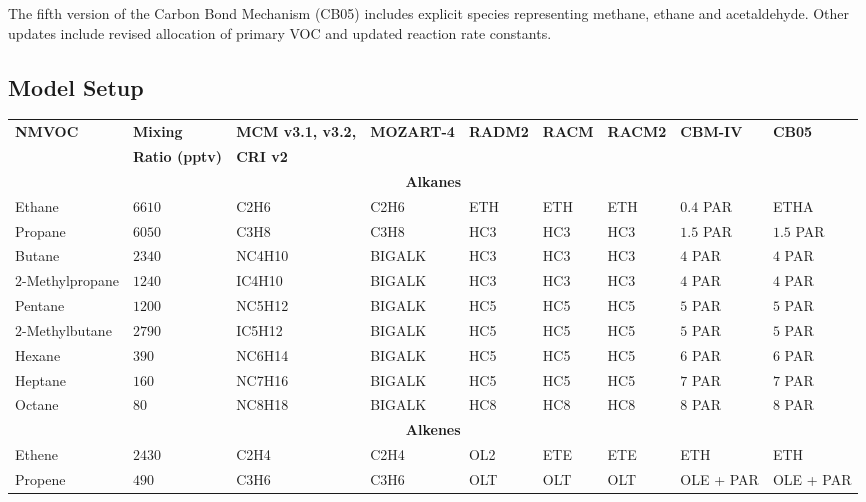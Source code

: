 The fifth version of the Carbon Bond Mechanism (CB05) \citep{Yarwood:2005} includes explicit species representing methane, ethane and acetaldehyde. 
Other updates include revised allocation of primary VOC and updated reaction rate constants.

\subsection{Model Setup} \label{ss:model_setup}

\begin{sidewaystable}
    \centering
    \begin{tabular}{lllllllll}
        \hline \hline
        \multirow{2}{*}{\textbf{NMVOC}} & \textbf{Mixing} & \textbf{MCM v3.1, v3.2,} & \multirow{2}{*}{\textbf{MOZART-4}} & \multirow{2}{*}{\textbf{RADM2}} & \multirow{2}{*}{\textbf{RACM}} & \multirow{2}{*}{\textbf{RACM2}} & \multirow{2}{*}{\textbf{CBM-IV}} & \multirow{2}{*}{\textbf{CB05}}\\ & \textbf{Ratio (pptv)} & \textbf{CRI v2} & & & & & & \\ 
        \hline \hline \multicolumn{9}{c}{\textbf{Alkanes}}  \\ \hline
        Ethane & $6610$ & C2H6 & C2H6 & ETH & ETH & ETH & $0.4$ PAR & ETHA \\
        Propane  & $6050$ & C3H8 & C3H8 & HC3 & HC3 & HC3 & $1.5$ PAR & $1.5$ PAR \\
        Butane & $2340$ & NC4H10 & BIGALK & HC3 & HC3 & HC3 & $4$ PAR & $4$ PAR \\
        $2$-Methylpropane & $1240$ & IC4H10 & BIGALK & HC3 & HC3 & HC3 & $4$ PAR & $4$ PAR \\
        Pentane & $1200$ & NC5H12 & BIGALK & HC5 & HC5 & HC5 & $5$ PAR & $5$ PAR \\
        $2$-Methylbutane & $2790$ & IC5H12 & BIGALK & HC5 & HC5 & HC5 & $5$ PAR & $5$ PAR \\
        Hexane & $390$ & NC6H14 & BIGALK & HC5 & HC5 & HC5 & $6$ PAR & $6$ PAR \\
        Heptane & $160$ & NC7H16 &  BIGALK & HC5 & HC5 & HC5 & $7$ PAR & $7$ PAR \\
        Octane & $80$ & NC8H18 & BIGALK & HC8 & HC8 & HC8 & $8$ PAR & $8$ PAR \\ \hline 
        \multicolumn{9}{c}{\textbf{Alkenes}} \\ \hline
        Ethene & $2430$ & C2H4 & C2H4 & OL2 & ETE & ETE & ETH & ETH \\
        Propene & $490$ & C3H6 & C3H6 & OLT & OLT & OLT & OLE + PAR & OLE + PAR \\ 

\end{tabular}
\end{sidewaystable}
